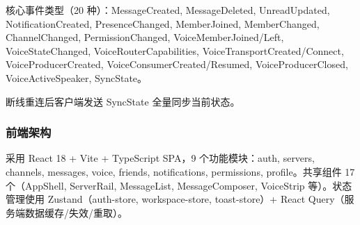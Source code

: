 核心事件类型（20 种）：MessageCreated, MessageDeleted, UnreadUpdated, NotificationCreated, PresenceChanged, MemberJoined, MemberChanged, ChannelChanged, PermissionChanged, VoiceMemberJoined/Left, VoiceStateChanged, VoiceRouterCapabilities, VoiceTransportCreated/Connect, VoiceProducerCreated, VoiceConsumerCreated/Resumed, VoiceProducerClosed, VoiceActiveSpeaker, SyncState。

断线重连后客户端发送 SyncState 全量同步当前状态。

\subsubsection{前端架构}

采用 React 18 + Vite + TypeScript SPA，9 个功能模块：auth, servers, channels, messages, voice, friends, notifications, permissions, profile。共享组件 17 个（AppShell, ServerRail, MessageList, MessageComposer, VoiceStrip 等）。状态管理使用 Zustand（auth-store, workspace-store, toast-store）+ React Query（服务端数据缓存/失效/重取）。